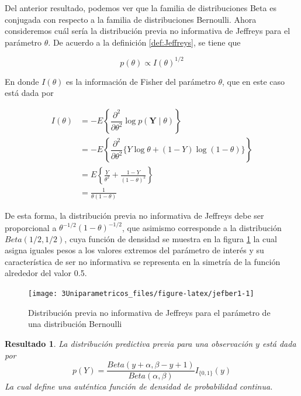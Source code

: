 \documentclass[
  10pt,
  spanish,
]{book}
\newtheorem{proposition}{Resultado}[chapter]
\theoremstyle{definition}
\theoremstyle{definition}
\theoremstyle{definition}
\theoremstyle{definition}
\theoremstyle{remark}
\begin{document}
Del anterior resultado, podemos ver que la familia de distribuciones
Beta es conjugada con respecto a la familia de distribuciones Bernoulli.
Ahora consideremos cuál sería la distribución previa no informativa de
Jeffreys para el parámetro \(\theta\). De acuerdo a la definición
\ref{def:Jeffreys}, se tiene que

\begin{equation*}
p(\theta)\propto I(\theta) ^{1/2}
\end{equation*}

En donde \(I(\theta)\) es la información de Fisher del parámetro \(\theta\),
que en este caso está dada por

\begin{align*}
I(\theta)&=
-E\left\{\dfrac{\partial^2}{\partial\theta^2}\log{p(\mathbf{Y}\mid\theta)}\right\}\\
&=-E\left\{\dfrac{\partial^2}{\partial\theta^2}\{Y\log\theta+(1-Y)\log(1-\theta)\}\right\}\\
&=E\left\{\frac{Y}{\theta^2}+\frac{1-Y}{(1-\theta)^2}\right\}\\
&=\frac{1}{\theta(1-\theta)}
\end{align*}

De esta forma, la distribución previa no informativa de Jeffreys debe
ser proporcional a \(\theta^{-1/2}(1-\theta)^{-1/2}\), que asimismo
corresponde a la distribución \(Beta(1/2,1/2)\), cuya función de densidad
se muestra en la figura \ref{fig:jefber1} la cual asigna iguales pesos
a los valores extremos del parámetro de interés y su característica de
ser no informativa se representa en la simetría de la función alrededor
del valor 0.5.

\begin{figure}

{\centering \texttt{[image: 3Uniparametricos\_files/figure-latex/jefber1-1]} 

}

\caption{Distribución previa no informativa de Jeffreys para el parámetro de una distribución Bernoulli}\label{fig:jefber1}
\end{figure}

\begin{proposition}
\protect\hypertarget{prp:unnamed-chunk-3}{}{\label{prp:unnamed-chunk-3} }La distribución predictiva previa para una observación \(y\) está dada por
\begin{equation}
\label{eq:Predipreviabernou}
p(Y)=
\frac{Beta(y+\alpha,\beta-y+1)}{Beta(\alpha,\beta)}I_{\{0,1\}}(y)
\end{equation}
La cual define una auténtica función de densidad de probabilidad continua.
\end{proposition}
\end{document}
